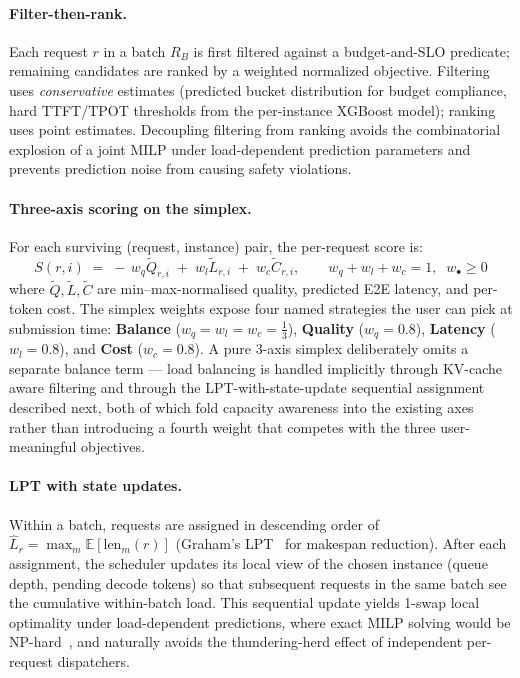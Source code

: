 \documentclass[10pt]{article}
\begin{document}
\paragraph{Filter-then-rank.}
Each request $r$ in a batch $R_B$ is first filtered against a budget-and-SLO predicate; remaining candidates are ranked by a weighted normalized objective. Filtering uses \emph{conservative} estimates (predicted bucket distribution for budget compliance, hard TTFT/TPOT thresholds from the per-instance XGBoost model); ranking uses point estimates. Decoupling filtering from ranking avoids the combinatorial explosion of a joint MILP under load-dependent prediction parameters and prevents prediction noise from causing safety violations.

\paragraph{Three-axis scoring on the simplex.}
For each surviving (request, instance) pair, the per-request score is:
\begin{equation}\label{eq:score}
S(r, i) \;=\; -\,w_q \tilde{Q}_{r,i} \;+\; w_l \tilde{L}_{r,i} \;+\; w_c \tilde{C}_{r,i}, \qquad w_q + w_l + w_c = 1, \;\; w_\bullet \ge 0
\end{equation}
where $\tilde{Q}, \tilde{L}, \tilde{C}$ are min--max-normalised quality, predicted E2E latency, and per-token cost. The simplex weights expose four named strategies the user can pick at submission time: \textbf{Balance} ($w_q{=}w_l{=}w_c{=}\tfrac{1}{3}$), \textbf{Quality} ($w_q{=}0.8$), \textbf{Latency} ($w_l{=}0.8$), and \textbf{Cost} ($w_c{=}0.8$). A pure 3-axis simplex deliberately omits a separate balance term — load balancing is handled implicitly through KV-cache aware filtering and through the LPT-with-state-update sequential assignment described next, both of which fold capacity awareness into the existing axes rather than introducing a fourth weight that competes with the three user-meaningful objectives.

\paragraph{LPT with state updates.}
Within a batch, requests are assigned in descending order of $\hat{L}_r = \max_m \mathbb{E}[\text{len}_m(r)]$ (Graham's LPT~\cite{graham1969bounds} for makespan reduction). After each assignment, the scheduler updates its local view of the chosen instance (queue depth, pending decode tokens) so that subsequent requests in the same batch see the cumulative within-batch load. This sequential update yields 1-swap local optimality under load-dependent predictions, where exact MILP solving would be NP-hard~\cite{job_shop_np_hard,nair2021solvingmixedintegerprograms}, and naturally avoids the thundering-herd effect of independent per-request dispatchers.
\end{document}

